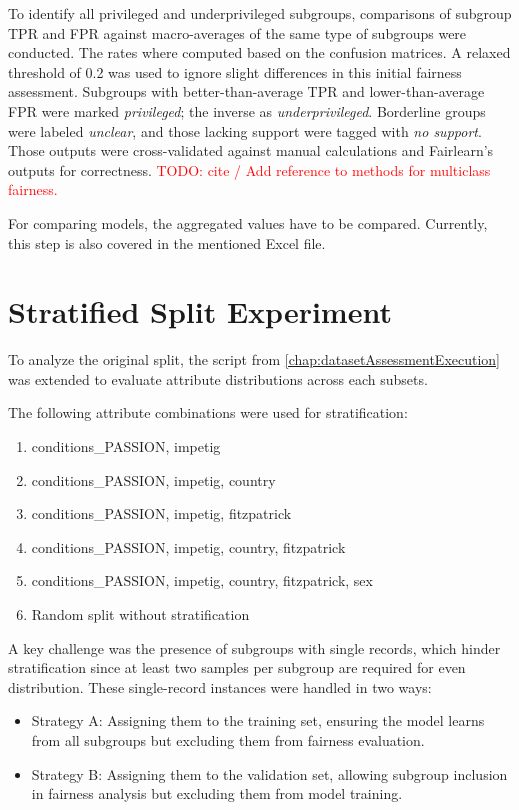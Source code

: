 \documentclass[12pt, a4paper, oneside]{book}   	%
\renewcommand{\todo}[1]{\textcolor{red}{TODO: #1}}
\begin{document}
		To identify all privileged and underprivileged subgroups, comparisons of subgroup \gls{TPR} and \gls{FPR} against macro-averages of the same type of subgroups were conducted. The rates where computed based on the confusion matrices. A relaxed threshold of 0.2 was used to ignore slight differences in this initial fairness assessment. Subgroups with better-than-average \gls{TPR} and lower-than-average \gls{FPR} were marked \textit{privileged}; the inverse as \textit{underprivileged}. Borderline groups were labeled \textit{unclear}, and those lacking support were tagged with \textit{no support}. Those outputs were cross-validated against manual calculations and \gls{Fairlearn}'s outputs for correctness. \todo{cite / Add reference to methods for multiclass fairness.}
		
		For comparing models, the aggregated values have to be compared. Currently, this step is also covered in the mentioned Excel file.
		
		
		\section{Stratified Split Experiment}
		To analyze the original split, the script from \autoref{chap:datasetAssessmentExecution} was extended to evaluate attribute distributions across each subsets.
		
		The following attribute combinations were used for stratification:
		\begin{enumerate}
			\item conditions\_PASSION, impetig
			\item conditions\_PASSION, impetig, country
			\item conditions\_PASSION, impetig, fitzpatrick
			\item conditions\_PASSION, impetig, country, fitzpatrick
			\item conditions\_PASSION, impetig, country, fitzpatrick, sex
			\item Random split without stratification
		\end{enumerate}
		
		A key challenge was the presence of subgroups with single records, which hinder stratification since at least two samples per subgroup are required for even distribution. These single-record instances were handled in two ways:
		\begin{itemize}
			\item Strategy A: Assigning them to the training set, ensuring the model learns from all subgroups but excluding them from fairness evaluation.
			\item Strategy B: Assigning them to the validation set, allowing subgroup inclusion in fairness analysis but excluding them from model training.
		\end{itemize}
		
\end{document}
